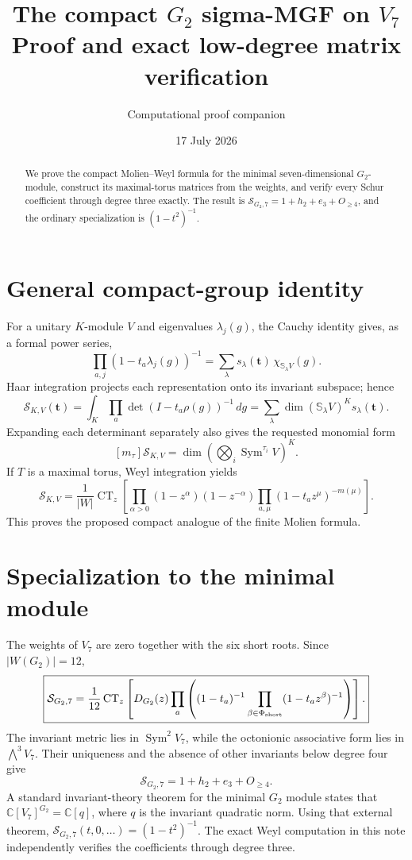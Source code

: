 \documentclass[10pt]{article}
\title{\color{navy}\textbf{The compact $G_2$ sigma-MGF on $V_7$}\\[1mm]\large Proof and exact low-degree matrix verification}
\author{Computational proof companion}\date{17 July 2026}
\newcommand{\Sg}{\mathcal S}
\newcommand{\CT}{\operatorname{CT}}
\begin{document}
\maketitle
\begin{abstract}
We prove the compact Molien--Weyl formula for the minimal seven-dimensional
$G_2$-module, construct its maximal-torus matrices from the weights, and
verify every Schur coefficient through degree three exactly.  The result is
$\Sg_{G_2,7}=1+h_2+e_3+O_{\ge4}$, and the ordinary specialization is
$(1-t^2)^{-1}$.
\end{abstract}

\section{General compact-group identity}
For a unitary $K$-module $V$ and eigenvalues $\lambda_j(g)$, the Cauchy
identity gives, as a formal power series,
\[
 \prod_{a,j}(1-t_a\lambda_j(g))^{-1}
 =\sum_\lambda s_\lambda(\mathbf t)\,\chi_{\mathbb S_\lambda V}(g).
\]
Haar integration projects each representation onto its invariant subspace;
hence
\[
 \boxed{\Sg_{K,V}(\mathbf t)=\int_K\prod_a\det(I-t_a\rho(g))^{-1}\,dg
 =\sum_\lambda\dim(\mathbb S_\lambda V)^K s_\lambda(\mathbf t).}
\]
Expanding each determinant separately also gives the requested monomial form
\[
 [m_\tau]\Sg_{K,V}
 =\dim\left(\bigotimes_i\operatorname{Sym}^{\tau_i}V\right)^K.
\]
If $T$ is a maximal torus, Weyl integration yields
\[
 \Sg_{K,V}=\frac1{|W|}\CT_z\!\left[
 \prod_{\alpha>0}(1-z^\alpha)(1-z^{-\alpha})
 \prod_{a,\mu}(1-t_a z^\mu)^{-m(\mu)}\right].
\]
This proves the proposed compact analogue of the finite Molien formula.

\section{Specialization to the minimal module}
The weights of $V_7$ are zero together with the six short roots.  Since
$|W(G_2)|=12$,
\[
 \boxed{\Sg_{G_2,7}=\frac1{12}\CT_z\left[D_{G_2}(z)
 \prod_a\left((1-t_a)^{-1}\prod_{\beta\in\Phi_{\rm short}}
 (1-t_a z^\beta)^{-1}\right)\right].}
\]
The invariant metric lies in $\operatorname{Sym}^2V_7$, while the octonionic
associative form lies in $\bigwedge^3V_7$.  Their uniqueness and the absence
of other invariants below degree four give
\[
 \boxed{\Sg_{G_2,7}=1+h_2+e_3+O_{\ge4}.}
\]
A standard invariant-theory theorem for the minimal $G_2$ module states that
$\mathbb C[V_7]^{G_2}=\mathbb C[q]$, where $q$ is the invariant quadratic
norm.  Using that external theorem,
$\Sg_{G_2,7}(t,0,\ldots)=(1-t^2)^{-1}$.  The exact Weyl computation in this
note independently verifies the coefficients through degree three.
\end{document}
